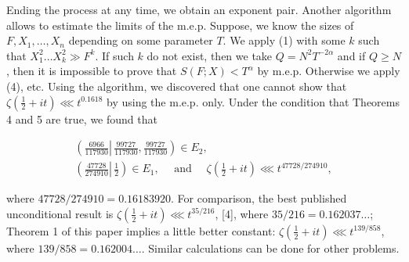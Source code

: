 \documentclass[10pt]{article}
\begin{document}
Ending the process at any time, we obtain an exponent pair. Another algorithm allows to estimate the limits of the m.e.p. Suppose, we know the sizes of $F, X_{1}, \ldots, X_{n}$ depending on some parameter $T$. We apply (1) with some $k$ such that $X_{1}^{2} \ldots X_{k}^{2} \gg F^{k}$. If such $k$ do not exist, then we take $Q=N^{2} T^{-2 \alpha}$ and if $Q \geqslant N$, then it is impossible to prove that $S(F ; X)<T^{\alpha}$ by m.e.p. Otherwise we apply (4), etc. Using the algorithm, we discovered that one cannot show that $\zeta\left(\frac{1}{2}+i t\right) \lll t^{0.1618}$ by using the m.e.p. only. Under the condition that Theorems 4 and 5 are true, we found that

$$
\begin{gathered}
\left(\frac{6966}{117930} \left\lvert\, \frac{99727}{117930}\right., \frac{99727}{117930}\right) \in E_{2}, \\
\left(\left.\frac{47728}{274910} \right\rvert\, \frac{1}{2}\right) \in E_{1}, \quad \text { and } \quad \zeta\left(\frac{1}{2}+i t\right) \lll t^{47728 / 274910},
\end{gathered}
$$

where $47728 / 274910=0.16183920$. For comparison, the best published unconditional result is $\zeta\left(\frac{1}{2}+i t\right) \lll t^{35 / 216}$, [4], where $35 / 216=0.162037 \ldots$; Theorem 1 of this paper implies a little better constant: $\zeta\left(\frac{1}{2}+i t\right) \lll t^{139 / 858}$, where $139 / 858=0.162004 \ldots$. Similar calculations can be done for other problems.
\end{document}
